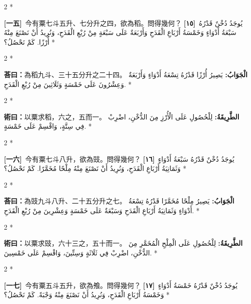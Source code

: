 \documentclass[11pt,a4paper]{article}
\newcommand{\ar}[1]{\arabicfont\beginR #1\endR}
\newcommand{\problemnum}[1]{\textbf{[\ignorespaces#1\unskip]}}
\newenvironment{bilingual}{%
  \begin{paracol}{2}%
  \switchcolumn[0]*%
}{%
  \end{paracol}%
}
\newcommand{\cnline}[1]{\switchcolumn[0]\noindent #1 \switchcolumn[1]}
\newcommand{\arline}[1]{\noindent\ar{#1} \switchcolumn[0]*}
\newenvironment{prob bilingual}{%
  \begin{paracol}{2}%
  \switchcolumn[0]*%
}{%
  \end{paracol}%
  \vspace{0.3em}%
}
\begin{document}
\begin{bilingual}
\cnline{\problemnum{一五}\, 今有粟七斗五升、七分升之四，欲為稻。問得幾何？}
\arline{\problemnum{١٥}\, يُوجَدُ دُخْنٌ قَدْرُهُ سَبْعَةُ أَدْوَاءٍ وَخَمْسَةُ أَرْبَاعِ الْقَدَحِ وَأَرْبَعَةٌ عَلَى سَبْعَةٍ مِنْ رُبْعِ الْقَدَحِ، وَنُرِيدُ أَنْ نَصْنَعَ مِنْهُ أُرْزًا. كَمْ نَحْصُلُ؟}
\end{bilingual}

\begin{bilingual}
\cnline{\textcolor{answercolor}{\textbf{荅曰：}}為稻九斗、三十五分升之二十四。}
\arline{\textcolor{answercolor}{\textbf{الْجَوَابُ:}} يَصِيرُ أُرْزًا قَدْرُهُ تِسْعَةُ أَدْوَاءٍ وَأَرْبَعَةٌ وَعِشْرُونَ عَلَى خَمْسَةٍ وَثَلَاثِينَ مِنْ رُبْعِ الْقَدَحِ.}
\end{bilingual}

\begin{bilingual}
\cnline{%
\textcolor{methodcolor}{\textbf{術曰：}}以粟求稻，六之，五而一。
}
\arline{%
\textcolor{methodcolor}{\textbf{الطَّرِيقَةُ:}} لِلْحُصُولِ عَلَى الْأُرْزِ مِنَ الدُّخْنِ، اضْرِبْ فِي سِتَّةٍ، وَاقْسِمْ عَلَى خَمْسَةٍ.
}
\end{bilingual}

\begin{bilingual}
\cnline{\problemnum{一六}\, 今有粟七斗八升，欲為豉。問得幾何？}
\arline{\problemnum{١٦}\, يُوجَدُ دُخْنٌ قَدْرُهُ سَبْعَةُ أَدْوَاءٍ وَثَمَانِيَةُ أَرْبَاعِ الْقَدَحِ، وَنُرِيدُ أَنْ نَصْنَعَ مِنْهُ مِلْحًا مُخَمَّرًا. كَمْ نَحْصُلُ؟}
\end{bilingual}

\begin{bilingual}
\cnline{\textcolor{answercolor}{\textbf{荅曰：}}為豉九斗八升、二十五分升之七。}
\arline{\textcolor{answercolor}{\textbf{الْجَوَابُ:}} يَصِيرُ مِلْحًا مُخَمَّرًا قَدْرُهُ تِسْعَةُ أَدْوَاءٍ وَثَمَانِيَةُ أَرْبَاعِ الْقَدَحِ وَسَبْعَةٌ عَلَى خَمْسَةٍ وَعِشْرِينَ مِنْ رُبْعِ الْقَدَحِ.}
\end{bilingual}

\begin{bilingual}
\cnline{%
\textcolor{methodcolor}{\textbf{術曰：}}以粟求豉，六十三之，五十而一。
}
\arline{%
\textcolor{methodcolor}{\textbf{الطَّرِيقَةُ:}} لِلْحُصُولِ عَلَى الْمِلْحِ الْمُخَمَّرِ مِنَ الدُّخْنِ، اضْرِبْ فِي ثَلَاثَةٍ وَسِتِّينَ، وَاقْسِمْ عَلَى خَمْسِينَ.
}
\end{bilingual}

\begin{bilingual}
\cnline{\problemnum{一七}\, 今有粟五斗五升，欲為飧。問得幾何？}
\arline{\problemnum{١٧}\, يُوجَدُ دُخْنٌ قَدْرُهُ خَمْسَةُ أَدْوَاءٍ وَخَمْسَةُ أَرْبَاعِ الْقَدَحِ، وَنُرِيدُ أَنْ نَصْنَعَ مِنْهُ وَجْبَةً. كَمْ نَحْصُلُ؟}
\end{bilingual}
\end{document}

